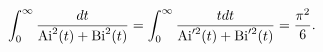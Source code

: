 \[\int_{0}^{\infty}\frac{dt}{{\mathop{\mathrm{Ai}\/}\nolimits^{2}}\!\left(t%
\right)+{\mathop{\mathrm{Bi}\/}\nolimits^{2}}\!\left(t\right)}=\int_{0}^{%
\infty}\frac{tdt}{{\mathop{\mathrm{Ai}\/}\nolimits'^{2}}\!\left(t\right)+{%
\mathop{\mathrm{Bi}\/}\nolimits'^{2}}\!\left(t\right)}=\frac{\pi^{2}}{6}.\]